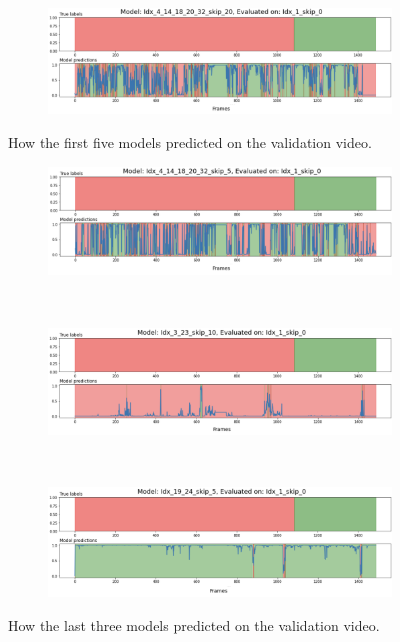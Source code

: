 \begin{figure}[H]
\begin{subfigure}{\linewidth}
	\end{subfigure}
	\\
	\begin{subfigure}{\linewidth}
		\centering
		\includegraphics[width=\linewidth]{Materials/Results/SP/M5On1C}
	\end{subfigure}
	\caption{How the first five models predicted on the validation video.}
	\label{firstfive}
\end{figure}

\begin{figure}[H]
	\centering
	\begin{subfigure}{\linewidth}
		\centering
		\includegraphics[width=\linewidth]{Materials/Results/SP/M6On1C}
	\end{subfigure}
	\\
	\begin{subfigure}{\linewidth}
		\centering
		\includegraphics[width=\linewidth]{Materials/Results/SP/M7On1C}
	\end{subfigure}
	\\
	\begin{subfigure}{\linewidth}
		\centering
		\includegraphics[width=\linewidth]{Materials/Results/SP/M8On1C}
	\end{subfigure}
	\caption{How the last three models predicted on the validation video.}
	\label{lastthree}
\end{figure}

